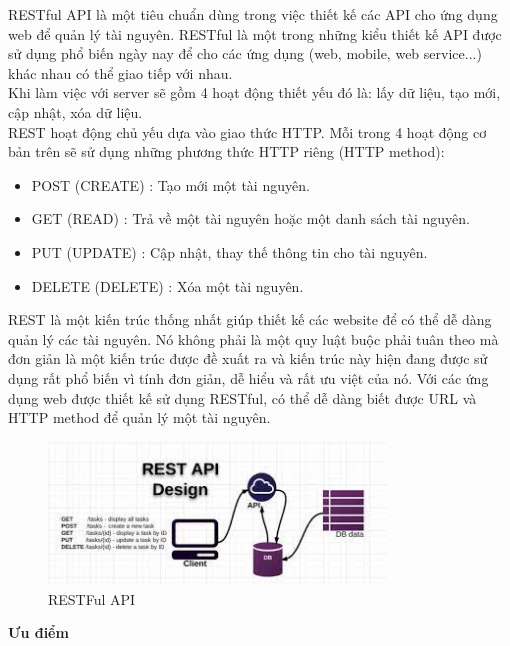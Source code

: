 		    RESTful API là một tiêu chuẩn dùng trong việc thiết kế các API cho ứng dụng web để quản lý tài nguyên. RESTful là một trong những kiểu thiết kế API được sử dụng phổ biến ngày nay để cho các ứng dụng (web, mobile, web service...) khác nhau có thể giao tiếp với nhau.\\
		    
		    Khi làm việc với server sẽ gồm 4 hoạt động thiết yếu đó là: lấy dữ liệu, tạo mới, cập nhật, xóa dữ liệu.\\
		    
		    REST hoạt động chủ yếu dựa vào giao thức HTTP. Mỗi trong 4 hoạt động cơ bản trên sẽ sử dụng những phương thức HTTP riêng (HTTP method):
		    
		    \begin{itemize}
		        \item POST (CREATE) : Tạo mới một tài nguyên.
		        \item GET (READ) : Trả về một tài nguyên hoặc một danh sách tài nguyên.
		        \item PUT (UPDATE) : Cập nhật, thay thế thông tin cho tài nguyên.
		        \item DELETE (DELETE) : Xóa một tài nguyên.
		    \end{itemize}
		    REST là một kiến trúc thống nhất giúp thiết kế các website để có thể dễ dàng quản lý các tài nguyên. Nó không phải là một quy luật buộc phải tuân theo mà đơn giản là một kiến trúc được đề xuất ra và kiến trúc này hiện đang được sử dụng rất phổ biến vì tính đơn giản, dễ hiểu và rất ưu việt của nó. Với các ứng dụng web được thiết kế sử dụng RESTful, có thể dễ dàng biết được URL và HTTP method để quản lý một tài nguyên.
		    
		    \begin{figure}[H]   			
		    	\includegraphics[width=0.8\textwidth]{Images/restful.jpeg}
		    	\centering
		    	\linebreak
		    	\caption{RESTFul API \cite{rest}}
		    \end{figure}
		    
		    \textbf{Ưu điểm}
		  
